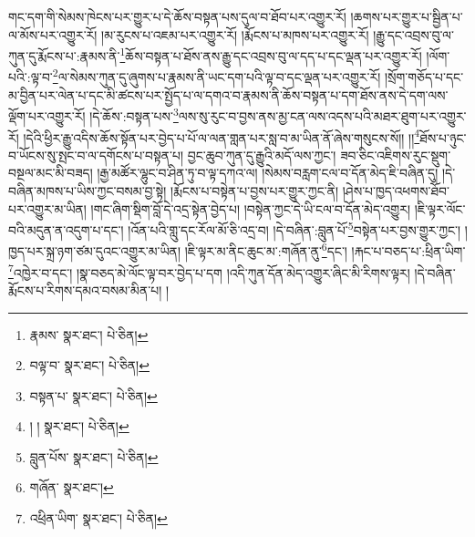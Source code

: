 གང་དག་གི་སེམས་ཁེངས་པར་གྱུར་པ་དེ་ཆོས་བསྟན་པས་དུལ་བ་ཐོབ་པར་འགྱུར་རོ། །ཆགས་པར་གྱུར་པ་སྦྱིན་པ་ལ་མོས་པར་འགྱུར་རོ། །མ་རུངས་པ་འཇམ་པར་འགྱུར་རོ། །རྨོངས་པ་མཁས་པར་འགྱུར་རོ། །རྒྱུ་དང་འབྲས་བུ་ལ་ཀུན་དུ་རྨོངས་པ་:རྣམས་ནི་\footnote{རྣམས་  སྣར་ཐང་།  པེ་ཅིན། }ཆོས་བསྟན་པ་ཐོས་ནས་རྒྱུ་དང་འབྲས་བུ་ལ་དད་པ་དང་ལྡན་པར་འགྱུར་རོ། །ལོག་པའི་:ལྟ་བ་\footnote{བལྟ་བ་  སྣར་ཐང་།  པེ་ཅིན། }ལ་སེམས་ཀུན་དུ་ཞུགས་པ་རྣམས་ནི་ཡང་དག་པའི་ལྟ་བ་དང་ལྡན་པར་འགྱུར་རོ། །སྲོག་གཅོད་པ་དང་མ་བྱིན་པར་ལེན་པ་དང་མི་ཚངས་པར་སྤྱོད་པ་ལ་དགའ་བ་རྣམས་ནི་ཆོས་བསྟན་པ་དག་ཐོས་ནས་དེ་དག་ལས་ལྡོག་པར་འགྱུར་རོ། །དེ་ཆོས་:བསྟན་པས་\footnote{བསྟན་པ་  སྣར་ཐང་།  པེ་ཅིན། }ལས་སུ་རུང་བ་བྱས་ནས་མྱ་ངན་ལས་འདས་པའི་མཐར་ཐུག་པར་འགྱུར་རོ། །དེའི་ཕྱིར་རྒྱུ་འདིས་ཆོས་སྟོན་པར་བྱེད་པ་པོ་ལ་ལན་གླན་པར་སླ་བ་མ་ཡིན་ནོ་ཞེས་གསུངས་སོ།། །།\footnote{། །  སྣར་ཐང་།  པེ་ཅིན། }ཐོས་པ་ཉུང་བ་ཡོངས་སུ་སྤང་བ་ལ་དགོངས་པ་བསྟན་པ། བྱང་ཆུབ་ཀུན་དུ་རྒྱུའི་མདོ་ལས་ཀྱང་། ཟབ་ཅིང་འཇིགས་རུང་སྡུག་བསྔལ་མང་མི་བཟད། །རྒྱ་མཚོར་ལྷུང་བ་ཤིན་ཏུ་བ་ལྟ་དཀའ་ལ། །སེམས་བརླག་ངལ་བ་དོན་མེད་ཇི་བཞིན་དུ། །དེ་བཞིན་མཁས་པ་ཡིས་ཀྱང་བསམ་བྱ་སྟེ། །རྨོངས་པ་བསྟེན་པ་བྱས་པར་གྱུར་ཀྱང་ནི། །ཤེས་པ་ཁྱད་འཕགས་ཐོབ་པར་འགྱུར་མ་ཡིན། །གང་ཞིག་སྡིག་བློ་དེ་འདྲ་སྟེན་བྱེད་པ། །བསྟེན་ཀྱང་དེ་ཡི་ངལ་བ་དོན་མེད་འགྱུར། །ཇི་ལྟར་ལོང་བའི་མདུན་ན་འདུག་པ་དང་། །འོན་པའི་གླུ་དང་རོལ་མོ་ཅི་འདྲ་བ། །དེ་བཞིན་:བླུན་པོ་\footnote{བླུན་པོས་  སྣར་ཐང་།  པེ་ཅིན། }བསྟེན་པར་བྱས་གྱུར་ཀྱང་། །ཁྱད་པར་སྐྲ་ཉག་ཙམ་དུའང་འགྱུར་མ་ཡིན། །ཇི་ལྟར་མ་ནིང་ཆུང་མ་:གཞོན་ནུ་\footnote{གཞོན་  སྣར་ཐང་། }དང་། །རྐང་པ་བཅད་པ་:ཕྲིན་ཡིག་\footnote{འཕྲིན་ཡིག་  སྣར་ཐང་།  པེ་ཅིན། }འཁྱེར་བ་དང་། །སྣ་བཅད་མེ་ལོང་ལྟ་བར་བྱེད་པ་དག །འདི་ཀུན་དོན་མེད་འགྱུར་ཞིང་མི་རིགས་ལྟར། །དེ་བཞིན་རྨོངས་པ་རིགས་དམའ་བསམ་མིན་པ། །
